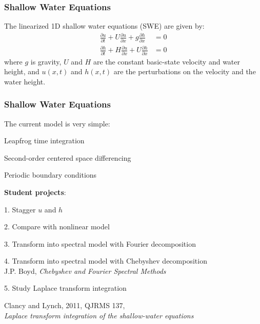 \documentclass[aspectratio=43,9pt]{beamer}
\begin{document}
%
%
\begin{frame}
	\frametitle{Shallow Water Equations}
	The linearized 1D shallow water equations (SWE) are given by:
	\begin{align*}
		\frac{\partial u}{\partial t}+U\frac{\partial u}{\partial x}+g\frac{\partial h}{\partial x}&=0\\
		\frac{\partial h}{\partial t}+H\frac{\partial u}{\partial x}+U\frac{\partial h}{\partial x}&=0
	\end{align*}
	where $g$ is gravity, $U$ and $H$ are the constant basic-state velocity and water height, and $u(x,t)$ and $h(x,t)$ are the perturbations on the velocity and the water height.
\end{frame}
%
%
\begin{frame}
	\frametitle{Shallow Water Equations}
	The current model is very simple:
	\begin{myitemize}{1ex}
		\item Leapfrog time integration
		\item Second-order centered space differencing
		\item Periodic boundary conditions
	\end{myitemize}
	{\vspace*{4ex}\bfseries Student projects}:
	\begin{myitemize}{1ex}
		\item[1.] Stagger $u$ and $h$
		\item[2.] Compare with nonlinear model
		\item[3.] Transform into spectral model with Fourier decomposition
		\item[4.] Transform into spectral model with Chebyshev decomposition\\[1mm]
			\quad J.P. Boyd, \emph{Chebyshev and Fourier Spectral Methods}\\
		\item[5.] Study Laplace transform integration\\[1mm]
			\quad\parbox{.9\textwidth}{Clancy and Lynch, 2011, QJRMS 137,\\\emph{Laplace transform integration of the shallow-water equations}}
	\end{myitemize}
\end{frame}
%
%
\end{document}

